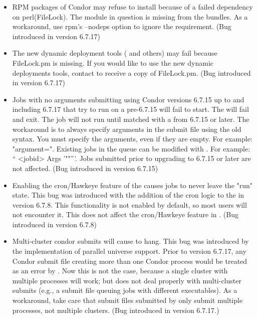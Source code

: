 \begin{itemize}

\item RPM packages of Condor may refuse to install because of a failed
dependency on perl(FileLock).  The module in question is missing from the
bundles.  
As a workaround, use rpm's --nodeps option to ignore the requirement.
(Bug introduced in version 6.7.17)

\item The new dynamic deployment tools ( and others) may
fail because FileLock.pm is missing.  If you would like to use the new dynamic
deployments tools, contact  to receive a copy
of FileLock.pm.  (Bug introduced in version 6.7.17)

\item Jobs with no arguments submitting using Condor versions 6.7.15 up to and
including 6.7.17 that try to run on a pre-6.7.15  will fail to
start.  The  will fail and exit.  The job will not run until
matched with a  from 6.7.15 or later.  The workaround is to
always specify arguments in the submit file using the old syntax.  You must
specify the arguments, even if they are empty.  For example: "argument=".
Existing jobs in the queue can be modified with .  For example:
`` <jobid> Args '""'''.  Jobs submitted prior to upgrading to
6.7.15 or later are not affected.
(Bug introduced in version 6.7.15)


\item Enabling the cron/Hawkeye feature of the  causes
jobs to never leave the "run" state.  This bug was introduced with the
addition of the cron logic to the  in version 6.7.8.
This functionality is not enabled by default, so most users will not
encounter it.
This does not affect the cron/Hawkeye feature in .
(Bug introduced in version 6.7.8)

\item Multi-cluster condor submits will cause  to hang.
This bug was introduced by the implementation of parallel universe
support.  Prior to version 6.7.17, any Condor submit file creating
more than one Condor process would be treated as an error by
.  Now this is not the case, because a single cluster
with multiple processes will work; but  does
not deal properly with multi-cluster submits (e.g., a submit file
queuing jobs with different executables).
As a workaround, take care that submit files submitted by 
only submit multiple processes, not multiple clusters.
(Bug introduced in version 6.7.17.)


\end{itemize}
